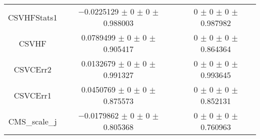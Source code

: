 \begin{table}
\begin{tabular}{ccc}
CSVHFStats1 & \num{-0.0225129} $\pm$ \num{0} $\pm$ \num{0} $\pm$ \num{0.988003} & \num{0} $\pm$ \num{0} $\pm$ \num{0} $\pm$ \num{0.987982}\\
CSVHF & \num{0.0789499} $\pm$ \num{0} $\pm$ \num{0} $\pm$ \num{0.905417} & \num{0} $\pm$ \num{0} $\pm$ \num{0} $\pm$ \num{0.864364}\\
CSVCErr2 & \num{0.0132679} $\pm$ \num{0} $\pm$ \num{0} $\pm$ \num{0.991327} & \num{0} $\pm$ \num{0} $\pm$ \num{0} $\pm$ \num{0.993645}\\
CSVCErr1 & \num{0.0450769} $\pm$ \num{0} $\pm$ \num{0} $\pm$ \num{0.875573} & \num{0} $\pm$ \num{0} $\pm$ \num{0} $\pm$ \num{0.852131}\\
CMS\_scale\_j & \num{-0.0179862} $\pm$ \num{0} $\pm$ \num{0} $\pm$ \num{0.805368} & \num{0} $\pm$ \num{0} $\pm$ \num{0} $\pm$ \num{0.760963}\\
\bottomrule
\end{tabular}
\end{table}